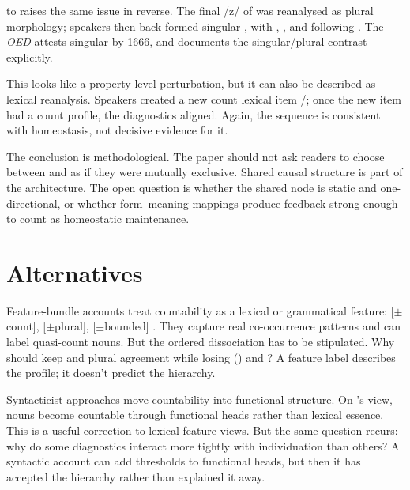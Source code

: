 \documentclass[12pt,a4paper]{article}
\begin{document}
 to  raises the same issue in reverse. The final /z/ of  was reanalysed as plural morphology; speakers then back-formed singular , with , , and  following \citep[s.v.\ , \emph{n.\textsuperscript{1}}]{oed}. The \emph{OED} attests singular  by 1666, and \textcite[p.~49]{greenwood1711} documents the singular/plural contrast explicitly.

This looks like a property-level perturbation, but it can also be described as lexical reanalysis. Speakers created a new count lexical item /; once the new item had a count profile, the diagnostics aligned. Again, the sequence is consistent with homeostasis, not decisive evidence for it.

The conclusion is methodological. The paper should not ask readers to choose between  and  as if they were mutually exclusive. Shared causal structure is part of the architecture. The open question is whether the shared node is static and one-directional, or whether form--meaning mappings produce feedback strong enough to count as homeostatic maintenance.

\section{Alternatives}\label{sec:alternatives-v3}

Feature-bundle accounts treat countability as a lexical or grammatical feature: [\(\pm\)count], [\(\pm\)plural], [\(\pm\)bounded] \citep{chomsky1965,allan1980}. They capture real co-occurrence patterns and can label quasi-count nouns. But the ordered dissociation has to be stipulated. Why should  keep  and plural agreement while losing () and ? A feature label describes the profile; it doesn't predict the hierarchy.

Syntacticist approaches move countability into functional structure. On \textcite{borer2005}'s view, nouns become countable through functional heads rather than lexical essence. This is a useful correction to lexical-feature views. But the same question recurs: why do some diagnostics interact more tightly with individuation than others? A syntactic account can add thresholds to functional heads, but then it has accepted the hierarchy rather than explained it away.
\end{document}
